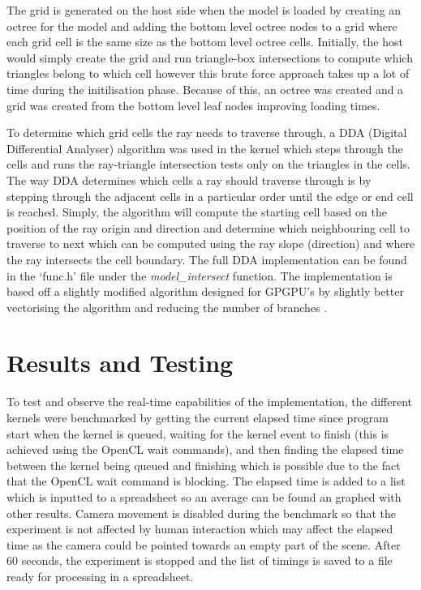 \documentclass[final]{cmpreport}
\begin{document}
The grid is generated on the host side when the model is loaded by creating an octree for the model and adding the bottom level octree nodes to a grid where each grid cell is the same size as the bottom level octree cells. Initially, the host would simply create the grid and run triangle-box intersections to compute which triangles belong to which cell however this brute force approach takes up a lot of time during the initilisation phase. Because of this, an octree was created and a grid was created from the bottom level leaf nodes improving loading times.

To determine which grid cells the ray needs to traverse through, a DDA (Digital Differential Analyser) algorithm was used in the kernel which steps through the cells and runs the ray-triangle intersection tests only on the triangles in the cells. The way DDA determines which cells a ray should traverse through is by stepping through the adjacent cells in a particular order until the edge or end cell is reached. Simply, the algorithm will compute the starting cell based on the position of the ray origin and direction and determine which neighbouring cell to traverse to next which can be computed using the ray slope (direction) and where the ray intersects the cell boundary. The full DDA implementation can be found in the `func.h' file under the \textit{model\_intersect} function. The implementation is based off a slightly modified algorithm designed for GPGPU's by slightly better vectorising the algorithm and reducing the number of branches \citep{3ddda} \citep{agate1991hero}.

\section{Results and Testing}

To test and observe the real-time capabilities of the implementation, the different kernels were benchmarked by getting the current elapsed time since program start when the kernel is queued, waiting for the kernel event to finish (this is achieved using the OpenCL wait commands), and then finding the elapsed time between the kernel being queued and finishing which is possible due to the fact that the OpenCL wait command is blocking. The elapsed time is added to a list which is inputted to a spreadsheet so an average can be found an graphed with other results. Camera movement is disabled during the benchmark so that the experiment is not affected by human interaction which may affect the elapsed time as the camera could be pointed towards an empty part of the scene. After 60 seconds, the experiment is stopped and the list of timings is saved to a file ready for processing in a spreadsheet.
\end{document}
